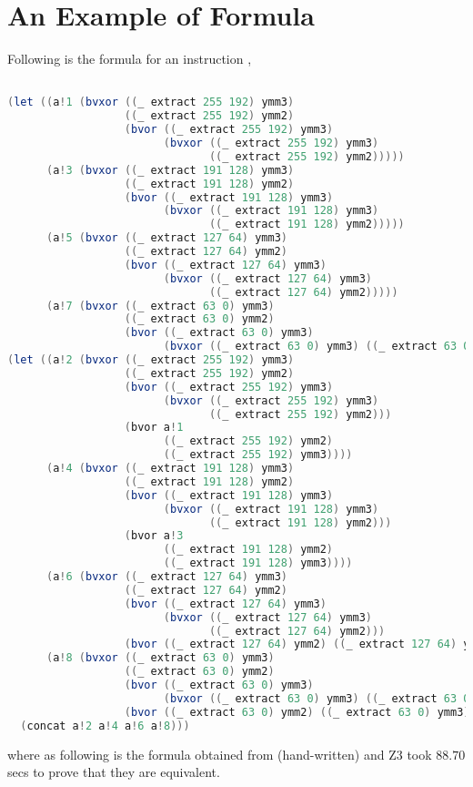 \section{An Example of \Strata Formula}\label{sec:AP:A}

Following is the \Strata formula for an instruction ,


\begin{lstlisting}[language=Java]

(let ((a!1 (bvxor ((_ extract 255 192) ymm3)
                  ((_ extract 255 192) ymm2)
                  (bvor ((_ extract 255 192) ymm3)
                        (bvxor ((_ extract 255 192) ymm3)
                               ((_ extract 255 192) ymm2)))))
      (a!3 (bvxor ((_ extract 191 128) ymm3)
                  ((_ extract 191 128) ymm2)
                  (bvor ((_ extract 191 128) ymm3)
                        (bvxor ((_ extract 191 128) ymm3)
                               ((_ extract 191 128) ymm2)))))
      (a!5 (bvxor ((_ extract 127 64) ymm3)
                  ((_ extract 127 64) ymm2)
                  (bvor ((_ extract 127 64) ymm3)
                        (bvxor ((_ extract 127 64) ymm3)
                               ((_ extract 127 64) ymm2)))))
      (a!7 (bvxor ((_ extract 63 0) ymm3)
                  ((_ extract 63 0) ymm2)
                  (bvor ((_ extract 63 0) ymm3)
                        (bvxor ((_ extract 63 0) ymm3) ((_ extract 63 0) ymm2))))))
(let ((a!2 (bvxor ((_ extract 255 192) ymm3)
                  ((_ extract 255 192) ymm2)
                  (bvor ((_ extract 255 192) ymm3)
                        (bvxor ((_ extract 255 192) ymm3)
                               ((_ extract 255 192) ymm2)))
                  (bvor a!1
                        ((_ extract 255 192) ymm2)
                        ((_ extract 255 192) ymm3))))
      (a!4 (bvxor ((_ extract 191 128) ymm3)
                  ((_ extract 191 128) ymm2)
                  (bvor ((_ extract 191 128) ymm3)
                        (bvxor ((_ extract 191 128) ymm3)
                               ((_ extract 191 128) ymm2)))
                  (bvor a!3
                        ((_ extract 191 128) ymm2)
                        ((_ extract 191 128) ymm3))))
      (a!6 (bvxor ((_ extract 127 64) ymm3)
                  ((_ extract 127 64) ymm2)
                  (bvor ((_ extract 127 64) ymm3)
                        (bvxor ((_ extract 127 64) ymm3)
                               ((_ extract 127 64) ymm2)))
                  (bvor ((_ extract 127 64) ymm2) ((_ extract 127 64) ymm3) a!5)))
      (a!8 (bvxor ((_ extract 63 0) ymm3)
                  ((_ extract 63 0) ymm2)
                  (bvor ((_ extract 63 0) ymm3)
                        (bvxor ((_ extract 63 0) ymm3) ((_ extract 63 0) ymm2)))
                  (bvor ((_ extract 63 0) ymm2) ((_ extract 63 0) ymm3) a!7))))
  (concat a!2 a!4 a!6 a!8)))
\end{lstlisting}

where as following is the formula obtained from \Stoke (hand-written) and 
 Z3 took $88.70$ secs to prove that they are equivalent.

\begin{lstlisting}[language=Java]
%ymm1  : (bvxor %ymm2 %ymm3)
\end{lstlisting}